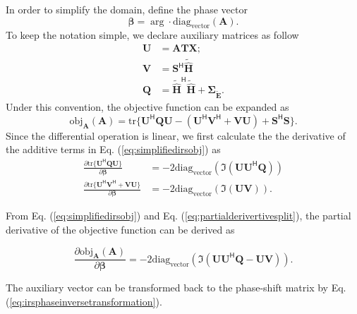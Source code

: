 \documentclass[12pt,draftclsnofoot,onecolumn,journal]{IEEEtran}
\begin{document}
In order to simplify the domain, define the phase vector
\begin{equation}
\boldsymbol \beta=\arg \cdot \mathrm{diag_{vector}}(\mathbf A).
\end{equation}
To keep the notation simple, we declare auxiliary matrices as follow
\begin{equation}
\begin{split}
\mathbf U&= \mathbf{ATX};\\
\mathbf V&=\mathbf S^{\mathsf H}\tilde{\hat{\mathbf H}}\\
\mathbf Q&=\tilde{\hat{\mathbf H}}^{\mathsf H}\tilde{\hat{\mathbf H}}+
\pmb{\Sigma_{\tilde{\mathbf E}}}.
\end{split}
\label{eq:irsgdsimplifiedsymbols}
\end{equation}
Under this convention, the objective function can be expanded as 
\begin{equation}
\mathrm{obj_{\mathbf A}}(\mathbf A)=\mathrm{tr}\{\mathbf U^{\mathsf H}\mathbf Q \mathbf U- (\mathbf U^{\mathsf H}\mathbf V^{\mathsf H}+\mathbf{VU})+\mathbf S^{\mathsf H}\mathbf S\}.
\label{eq:simplifiedirsobj}
\end{equation}
Since the differential operation is linear, we first calculate the the derivative of the additive terms in Eq. (\ref{eq:simplifiedirsobj}) as
\begin{equation}
\begin{split}
\frac{\partial \mathrm{tr}\{\mathbf U^{\mathsf H}\mathbf Q \mathbf U\}}{\partial\boldsymbol\beta} &= -2\mathrm{diag_{vector}}(\Im(\mathbf{UU^{\mathsf H}Q}))\\
\frac{\partial{\mathrm{tr}\{\mathbf U^{\mathsf H}\mathbf V^{\mathsf H}+\mathbf{VU}\}}}{\partial{\boldsymbol{\beta}}} &= -2\mathrm{diag_{vector}}(\Im(\mathbf{UV})).
\end{split}
\label{eq:partialderivertivesplit}
\end{equation}

From Eq. (\ref{eq:simplifiedirsobj}) and Eq. (\ref{eq:partialderivertivesplit}), the partial derivative of the objective function can be derived as

\begin{equation}
\frac{\partial \mathrm{obj_{\mathbf A}}(\mathbf A)}{\partial\boldsymbol\beta} = -2\mathrm{diag_{vector}}(\Im(\mathbf{UU^{\mathsf H}Q}-\mathbf{UV})).
\label{eq:partialderivertivetotal}
\end{equation}

The auxiliary vector can be transformed back to the phase-shift matrix by Eq. (\ref{eq:irsphaseinversetransformation}).
\end{document}
